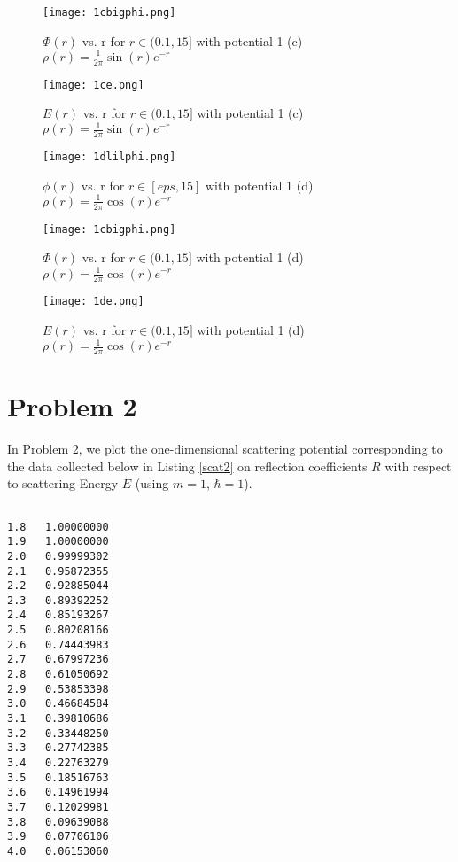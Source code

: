 \documentclass[12pt]{article}
\begin{document}
\begin{figure}[H]
\texttt{[image: 1cbigphi.png]}
\caption{$\Phi(r)$ vs. r for $r\in(0.1,15]$ with potential 1 (c) $\rho(r)=\frac{1}{2\pi}\sin(r)e^{-r}$}
\label{1cbigphi}
\end{figure}

\begin{figure}[H]
\texttt{[image: 1ce.png]}
\caption{$E(r)$ vs. r for $r\in(0.1,15]$ with potential 1 (c) $\rho(r)=\frac{1}{2\pi}\sin(r)e^{-r}$}
\label{1ce}
\end{figure}

\begin{figure}[H]
\texttt{[image: 1dlilphi.png]}
\caption{$\phi(r)$ vs. r for $r\in[eps,15]$ with potential 1 (d) $\rho(r)=\frac{1}{2\pi}\cos(r)e^{-r}$}
\label{1dlilphi}
\end{figure}

\begin{figure}[H]
\texttt{[image: 1cbigphi.png]}
\caption{$\Phi(r)$ vs. r for $r\in(0.1,15]$ with potential 1 (d) $\rho(r)=\frac{1}{2\pi}\cos(r)e^{-r}$}
\label{1cbigphi}
\end{figure}

\begin{figure}[H]
\texttt{[image: 1de.png]}
\caption{$E(r)$ vs. r for $r\in(0.1,15]$ with potential 1 (d) $\rho(r)=\frac{1}{2\pi}\cos(r)e^{-r}$}
\label{1blilphi}
\end{figure}

\section{Problem 2}

In Problem 2, we plot the one-dimensional scattering potential corresponding to the data collected below in Listing \ref{scat2} on reflection coefficients $R$ with respect to scattering Energy $E$ (using $m=1$, $\hbar=1$).

\begin{lstlisting}[frame=single,caption={{\tt scat.data}},label=scat2]

1.8   1.00000000
1.9   1.00000000
2.0   0.99999302
2.1   0.95872355
2.2   0.92885044
2.3   0.89392252
2.4   0.85193267
2.5   0.80208166
2.6   0.74443983
2.7   0.67997236
2.8   0.61050692
2.9   0.53853398
3.0   0.46684584
3.1   0.39810686
3.2   0.33448250
3.3   0.27742385
3.4   0.22763279
3.5   0.18516763
3.6   0.14961994
3.7   0.12029981
3.8   0.09639088
3.9   0.07706106
4.0   0.06153060

\end{lstlisting}
\end{document}
